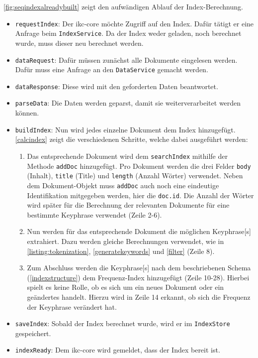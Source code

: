 \autoref{fig:seqindexalreadybuilt} zeigt den aufwändigen Ablauf der Index-Berechnung. 
\begin{itemize}
    \item \texttt{requestIndex}: Der \gls{ikc-core} möchte Zugriff auf den Index. Dafür tätigt er eine Anfrage beim \texttt{IndexService}. Da der Index weder geladen, noch berechnet wurde, muss dieser neu berechnet werden.
    \item \texttt{dataRequest}: Dafür müssen zunächst alle Dokumente eingelesen werden. Dafür muss eine Anfrage an den \texttt{DataService} gemacht werden.
    \item \texttt{dataResponse}: Diese wird mit den geforderten Daten beantwortet.
    \item \texttt{parseData}: Die Daten werden geparst, damit sie weiterverarbeitet werden können.
    \item \texttt{buildIndex}: Nun wird jedes einzelne Dokument dem Index hinzugefügt. \autoref{calcindex} zeigt die verschiedenen Schritte, welche dabei ausgeführt werden:
    \begin{enumerate}
        \item Das entsprechende Dokument wird dem \texttt{searchIndex} mithilfe der Methode \texttt{addDoc} hinzugefügt. Pro Dokument werden die drei Felder \texttt{body} (Inhalt), \texttt{title} (Title) und \texttt{length} (Anzahl Wörter) verwendet. Neben dem Dokument-Objekt muss \texttt{addDoc} auch noch eine eindeutige Identifikation mitgegeben werden, hier die \texttt{doc.id}. Die Anzahl der Wörter wird später für die Berechnung der relevanten Dokumente für eine bestimmte \gls{Keyphrase} verwendet (Zeile 2-6). 
        \item Nun werden für das entsprechende Dokument die mög\-lich\-en \gls{Keyphrase}[s] extrahiert. Dazu werden gleiche Berechnungen verwendet, wie in \autoref{listing:tokenization}, \autoref{generatekeywords} und \autoref{filter} (Zeile 8).
        \item Zum Abschluss werden die \gls{Keyphrase}[s] nach dem beschriebenen Schema (\autoref{indexstructure}) dem Frequenz-Index hinzugefügt (Zeile 10-28). Hierbei spielt es keine Rolle, ob es sich um ein neues Dokument oder ein geändertes handelt. Hierzu wird in Zeile 14 erkannt, ob sich die Frequenz der \gls{Keyphrase} verändert hat.
    \end{enumerate}
    \item \texttt{saveIndex}: Sobald der Index berechnet wurde, wird er im \texttt{In\-dex\-Store} gespeichert.
    \item \texttt{indexReady}: Dem \gls{ikc-core} wird gemeldet, dass der Index bereit ist.
\end{itemize}

